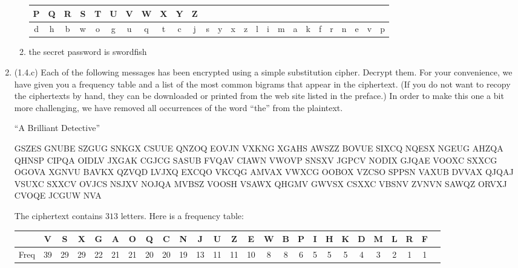 \documentclass[12pt]{amsart}
\theoremstyle{definition}
\begin{document}
\begin{enumerate}
\begin{enumerate}
\begin{center}
\begin{tabular}{|c |c |c |c |c |c |c |c |c |c |c |c |c |c |c |c |c |c |c |c |c |c |c |c| c| c|}
        			P & Q & R & S & T & U & V & W & X & Y & Z \\
        			\hline
        			d & h & b & w & o & g & u & q & t & c & j & s & y & x & z & 
        			l & i & m & a & k & f & r & n & e & v & p \\
        			\hline
        		\end{tabular}
                \end{center}
            \item the secret password is swordfish
        \end{enumerate}
\item (1.4.c) Each of the following messages has been encrypted using a simple
	substitution cipher. Decrypt them. For your convenience, we have given
	you a frequency table and a list of the most common bigrams that appear
	in the ciphertext. (If you do not want to recopy the ciphertexts by
	hand, they can be downloaded or printed from the web site listed in the
	preface.) In order to make this one a bit more challenging, we have
	removed all occurrences of the word “the” from the plaintext. 

	“A Brilliant Detective”
	\begin{center}
		\ttfamily
		GSZES GNUBE SZGUG SNKGX CSUUE QNZOQ EOVJN VXKNG XGAHS AWSZZ
		BOVUE SIXCQ NQESX NGEUG AHZQA QHNSP CIPQA OIDLV JXGAK CGJCG
		SASUB FVQAV CIAWN VWOVP SNSXV JGPCV NODIX GJQAE VOOXC SXXCG
		OGOVA XGNVU BAVKX QZVQD LVJXQ EXCQO VKCQG AMVAX VWXCG OOBOX
		VZCSO SPPSN VAXUB DVVAX QJQAJ VSUXC SXXCV OVJCS NSJXV NOJQA
		MVBSZ VOOSH VSAWX QHGMV GWVSX CSXXC VBSNV ZVNVN SAWQZ ORVXJ
		CVOQE JCGUW NVA
	\end{center}
		
	The ciphertext contains $313$ letters. Here is a frequency table: 
	\begin{center}
		\ttfamily
		\begin{tabular}{|c||c |c |c |c |c |c |c |c |c |c |c |c |c |c |c |c |c |c |c |c |c |c |c| c| c|}
			\hline
			& V & S & X & G & A & O & Q & C & N & J & U & Z & E & W
			& B & P & I & H & K & D & M & L & R & F \\
			\hline
			Freq  & 39 & 29 & 29 & 22 & 21 & 21 & 20 & 20 & 19 & 13
			      & 11 & 11 & 10 & 8 & 8 & 6 & 5 & 5 & 5 & 4 & 3 &
			2 & 1 & 1 \\
			\hline
		\end{tabular}
	\end{center}


\end{enumerate}
\end{document}
